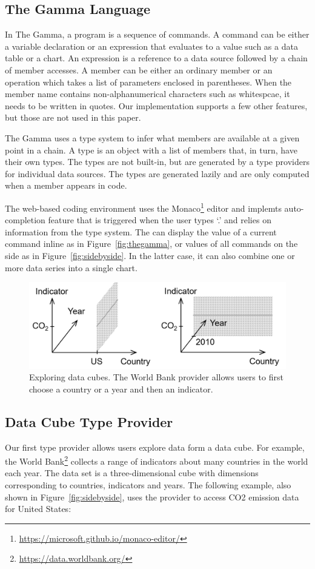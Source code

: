 \documentclass[manuscript,review,anonymous]{acmart}
\begin{document}
\subsection{The Gamma Language}
In The Gamma, a program is a sequence of commands. A command can be either a variable declaration
or an expression that evaluates to a value such as a data table or a chart.
An expression is a reference to a data source followed by a chain of member accesses.
A member can be either an ordinary member or an operation which takes a list of parameters
enclosed in parentheses. When the member name contains non-alphanumerical characters such as
whitespcae, it needs to be written in quotes. Our implementation supports a few other features,
but those are not used in this paper.

The Gamma uses a type system to infer what members are available at a given point in a chain.
A type is an object with a list of members that, in turn, have their own types.
The types are not built-in, but are generated by a type providers for individual data sources.
The types are generated lazily and are only computed when a member appears in code.

The web-based coding environment uses the Monaco\footnote{\url{https://microsoft.github.io/monaco-editor/}}
editor and implemts auto-completion feature that is triggered when the user types `.' and relies
on information from the type system. The can display the value of a current command inline
as in Figure~\ref{fig:thegamma}, or values of all commands on the side as in Figure~\ref{fig:sidebyside}.
In the latter case, it can also combine one or more data series into a single chart.

\begin{figure}
\centering
\includegraphics[scale=0.28]{figures/cubetp}
\caption{Exploring data cubes. The World Bank provider allows users to first choose
  a country or a year and then an indicator.}
\label{fig:cubetp}
\end{figure}

\subsection{Data Cube Type Provider}
Our first type provider allows users explore data form a data cube. For example, the World
Bank\footnote{\url{https://data.worldbank.org/}} collects a range of indicators about many
countries in the world each year. The data set is a three-dimensional cube with dimensions
corresponding to countries, indicators and years. The following example, also shown in
Figure~\ref{fig:sidebyside}, uses the provider to access CO2 emission data for United States:
\end{document}
